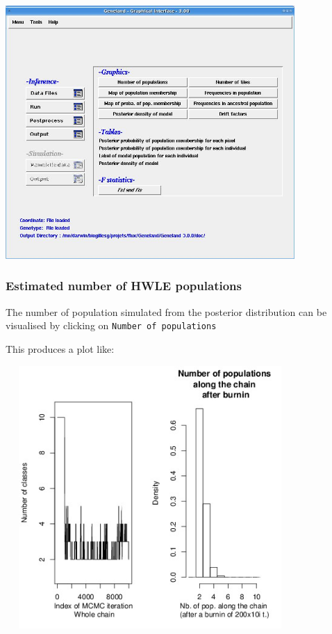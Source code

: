 \documentclass[a4paper,10pt]{article}
\begin{document}
\centerline{\includegraphics[width=11cm]{./fig/output.jpg}}

\bigskip

\clearpage
\subsubsection{Estimated number  of HWLE populations}
The number of population simulated from the posterior distribution can be visualised by clicking on \texttt{Number of populations}


This produces a plot like:\\

\centerline{\includegraphics[height=10cm,width=11cm]{./fig/npop.jpeg}}
\end{document}
